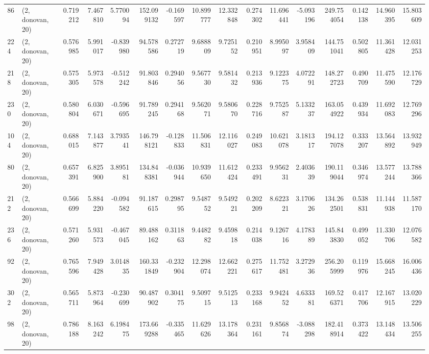 \begin{tabular}{llrrrrrrrrrrrrrr}
86  &  (2, donovan, 20) &   0.719212 &   7.467810 &   5.770094 &   152.099132 &  -0.169597 &  10.899777 &  12.332848 &  0.274302 &  11.696441 &  -5.093196 &   249.754054 &  0.142138 &  14.960395 &  15.803609 \\
224 &  (2, donovan, 20) &   0.576985 &   5.991017 &  -0.839980 &    94.578586 &   0.272719 &   9.688809 &   9.725152 &  0.210951 &   8.995097 &   3.958409 &   144.751041 &  0.502805 &  11.361428 &  12.031253 \\
218 &  (2, donovan, 20) &   0.575305 &   5.973578 &  -0.512242 &    91.803846 &   0.294056 &   9.567730 &   9.581432 &  0.213936 &   9.122375 &   4.072291 &   148.272723 &  0.490709 &  11.475590 &  12.176729 \\
230 &  (2, donovan, 20) &   0.580804 &   6.030671 &  -0.596695 &    91.789245 &   0.294168 &   9.562071 &   9.580670 &  0.228716 &   9.752587 &   5.133237 &   163.054922 &  0.439934 &  11.692083 &  12.769296 \\
104 &  (2, donovan, 20) &   0.688015 &   7.143877 &   3.793541 &   146.798121 &  -0.128833 &  11.506831 &  12.116027 &  0.249083 &  10.621078 &   3.181317 &   194.127078 &  0.333207 &  13.564892 &  13.932949 \\
80  &  (2, donovan, 20) &   0.657391 &   6.825900 &   3.895181 &   134.848381 &  -0.036944 &  10.939650 &  11.612424 &  0.233491 &   9.956231 &   2.403639 &   190.119044 &  0.346974 &  13.577244 &  13.788366 \\
212 &  (2, donovan, 20) &   0.566699 &   5.884220 &  -0.094582 &    91.187615 &   0.298795 &   9.548752 &   9.549221 &  0.202209 &   8.622321 &   3.170626 &   134.262501 &  0.538831 &  11.144938 &  11.587170 \\
236 &  (2, donovan, 20) &   0.571260 &   5.931573 &  -0.467045 &    89.488162 &   0.311863 &   9.448282 &   9.459818 &  0.214038 &   9.126716 &   4.178389 &   145.843830 &  0.499052 &  11.330706 &  12.076582 \\
92  &  (2, donovan, 20) &   0.765596 &   7.949428 &   3.014835 &   160.331849 &  -0.232904 &  12.298074 &  12.662221 &  0.275617 &  11.752481 &   3.272936 &   256.205999 &  0.119976 &  15.668245 &  16.006436 \\
302 &  (2, donovan, 20) &   0.565711 &   5.873964 &  -0.230699 &    90.487902 &   0.304175 &   9.509715 &   9.512513 &  0.233168 &   9.942452 &   4.633381 &   169.526371 &  0.417706 &  12.167915 &  13.020229 \\
98  &  (2, donovan, 20) &   0.786188 &   8.163242 &   6.198475 &   173.669288 &  -0.335465 &  11.629626 &  13.178364 &  0.231161 &   9.856874 &  -3.088298 &   182.418914 &  0.373422 &  13.148434 &  13.506255 \\

\end{tabular}
